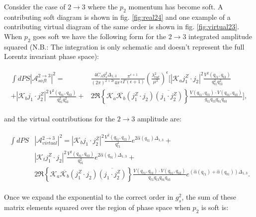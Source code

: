 		Consider the case of $2\rightarrow3$ where the $p_2$ momentum has become soft.  A contributing
		soft diagram is shown in fig. \eqref{fig:real24} and one example of a contributing virtual
		diagram of the same order is shown in fig. \eqref{fig:virtual23}. When $p_2$ goes soft we have
		the following form for the $2\rightarrow3$ integrated amplitude squared ({N.B.}: The
		integration is only schematic and doesn't represent the full Lorentz invariant phase space):

		\begin{align}
		\begin{split}
			\int dPS|\mathcal{A}^{2\rightarrow3}_{soft}|^2 = &\frac{4C_Ag_s^2\Delta_{1,3}}{(2\pi)^{2+2\epsilon}4\pi}
			\frac{\pi^{\epsilon+1}}{\epsilon\Gamma(\epsilon+1)}
			\left(\frac{\lambda_{cut}^2}{\mu^2}\right)^\epsilon\Bigg[|\mathcal{K}_aj_1^Z\cdot j_2|^2
			\frac{V^2(q_{t1}, q_{t3})}{q^2_{t1}q^2_{t3}} \\
			+ |\mathcal{K}_bj_1\cdot j_2^Z|^2
			\frac{V^2(q_{b1}, q_{b3})}{q^2_{b1}q^2_{b3}} +
			& 2\Re\left\{\mathcal{K}_a\overline{\mathcal{K}_b}
			(j_1^Z\cdot j_2)\overline{(j_1\cdot j_2^Z)}\right\} \frac{V(q_{t1}, q_{t3})
			\cdot V(q_{b1}, q_{b3})}{q_{t1}q_{t3}q_{b1}q_{b3}}\Bigg],
		\end{split}
		\end{align}

		and the virtual contributions for the $2\rightarrow3$ amplitude are:

		\begin{align}
		\begin{split}
			\int dPS&|\mathcal{A}^{2\rightarrow3}_{virtual}|^2 = |\mathcal{K}_bj_1\cdot j_2^Z|^2
			\frac{V^2(q_{t1}, q_{t3})}{q_{t1}^2}e^{2\hat{\alpha}(q_{t1})\Delta_{1,3}} + \\
			&|\mathcal{K}_tj_1^Z\cdot j_2|^2 \frac{V^2(q_{b1}, q_{b3})}{q_{b1}^2}e^{2\hat{\alpha}(q_{b1})\Delta_{1,3}} +  \\
			& 2\Re\left\{\mathcal{K}_a\overline{\mathcal{K}_b}  (j_1^Z\cdot j_2)\overline{(j_1\cdot j_2^Z)}\right\}
			\frac{V(q_{t1}, q_{t3})\cdot V(q_{b1}, q_{b3})}{q_{t1}q_{t3}q_{b1}q_{b3}}e^{(\hat{\alpha}(q_{t1}) +
			\hat{\alpha}(q_{b1}))\Delta_{1,3}}.
		\end{split}
		\end{align}

		Once we expand the exponential to the correct order in $g_s^2$, the sum of these
		matrix elements squared over the region of phase space when $p_2$ is soft is:

